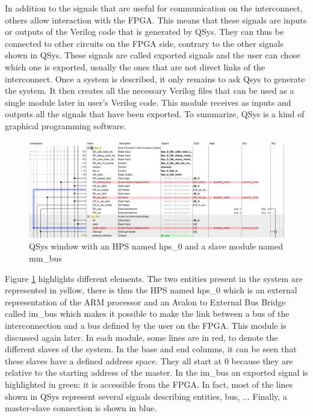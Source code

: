 In addition to the signals that are useful for communication on the interconnect, others allow interaction 
with the FPGA. This means that these signals are inputs or outputs of the Verilog code that is generated
by QSys. They can thus be connected to other circuits on the FPGA side, contrary to the other
signals shown in QSys. These signals are called exported signals and the user can chose which one
is exported, usually the ones that are not direct links of the interconnect. Once a system is 
described, it only
remains to ask Qsys to generate the system. It then creates all the necessary Verilog files that 
can be used as a single module later in user's Verilog code. This module receives as inputs and 
outputs all the signals that have been exported. To summarize, QSys is a kind of graphical 
programming software.

\begin{figure}[H]
    \centering
    \includegraphics[width=\linewidth]{Chapter2-FPGA_Flow/res/qsys.PNG}
    \caption{QSys window with an HPS named hps\_0 and a slave module named mm\_bus}
    \label{fig:tools/qsys}
\end{figure}

Figure \ref{fig:tools/qsys} highlights different elements. The two entities present in the system are 
represented in yellow, there is thus the HPS named hps\_0 which is an external representation of the 
ARM processor and an Avalon to External Bus Bridge called im\_bus which makes it possible to make 
the link between a bus of the interconnection and a bus defined by the user on the FPGA. This module 
is discussed again later. In each module, some lines are in red, to denote the 
different slaves of the system. In the base and end columns, it can be seen that these slaves have 
a defined address space. They all start at 0 because they are relative to the starting address of 
the master. In the im\_bus an exported signal is highlighted in green: it is accessible 
from the FPGA. In fact, most of the lines shown in QSys represent several signals describing entities,
bus, ... Finally, a master-slave connection is shown in blue.

